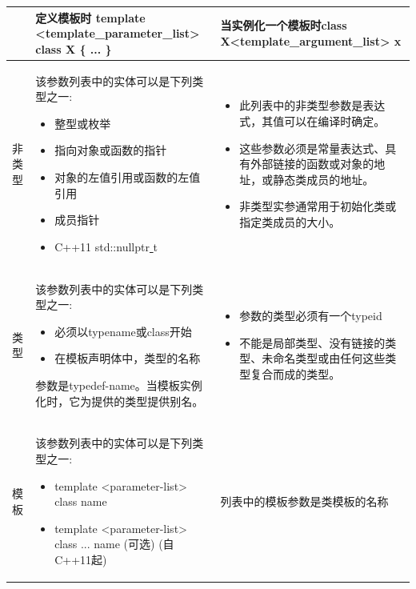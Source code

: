 \begin{table}[h]
	\begin{tabularx}{\textwidth}{|p{2cm}|X|X|}
		\hline
		& 定义模板时 template <template\_parameter\_list> class X \{ ... \} & 当实例化一个模板时class X<template\_argument\_list> x \\ 
		
		\hline
		非类型
		 & 
		该参数列表中的实体可以是下列类型之一:
		\begin{itemize}
			\item 整型或枚举
			\item 指向对象或函数的指针
			\item 对象的左值引用或函数的左值引用
			\item 成员指针
			\item C++11 std::nullptr\underline{ }t
		\end{itemize} & 
		\begin{itemize}
		\item 此列表中的非类型参数是表达式，其值可以在编译时确定。
		\item 这些参数必须是常量表达式、具有外部链接的函数或对象的地址，或静态类成员的地址。
		\item 非类型实参通常用于初始化类或指定类成员的大小。
		\end{itemize} \\
		\hline
		类型 
		& 
		该参数列表中的实体可以是下列类型之一:
		\begin{itemize}
			\item 必须以typename或class开始
			\item 在模板声明体中，类型的名称	
		\end{itemize} 
		参数是typedef-name。当模板实例化时，它为提供的类型提供别名。
		& 
		\begin{itemize}
			\item 参数的类型必须有一个typeid
			\item 不能是局部类型、没有链接的类型、未命名类型或由任何这些类型复合而成的类型。
		\end{itemize} \\
		\hline
		模板 
		& 
		该参数列表中的实体可以是下列类型之一:
		\begin{itemize}
			\item template <parameter-list> class name
			\item template <parameter-list> class ... name
			(可选) (自C++11起)
		\end{itemize} 
		& 
		列表中的模板参数是类模板的名称 \\
		\hline
	\end{tabularx}
\end{table}

